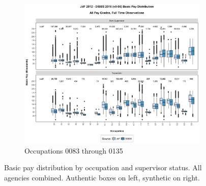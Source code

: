 \documentclass[10pt, letterpaper]{article}
\begin{document}
\begin{spacing}{1.0}
\begin{figure}[h]
\begin{subfigure}{1\textwidth}
        \includegraphics[width=6in, trim={0 1in 0 0.75in}, clip]{JdFDIBBSBasicPaySupervisoryStatusOccupation21.png}
        \caption{Occupations 0083 through 0135}
        \vspace{10pt}
    \end{subfigure}
    \caption{Basic pay distribution by occupation and supervisor status.  All agencies combined.  Authentic boxes on left, synthetic on right.}
    \label{figure:JdFDIBBSBasicPaySupervisoryStatusOccupation1}
\end{figure}

\clearpage


\end{spacing}
\end{document}
